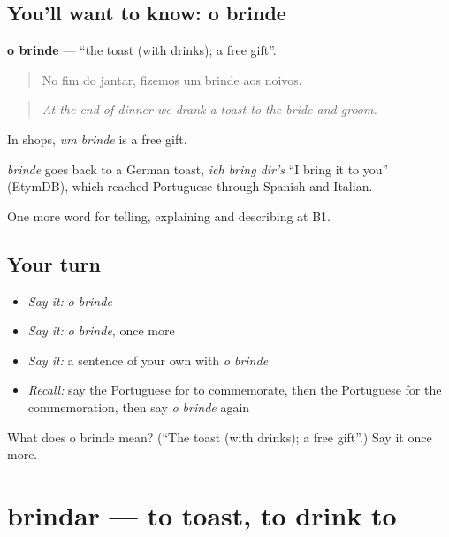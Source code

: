 \subsection*{You'll want to know: o brinde}
\textbf{o brinde} — \textquotedblleft{}the toast (with drinks); a free gift\textquotedblright{}.

\begin{quote}
No fim do jantar, fizemos um brinde aos noivos.
\end{quote}

\begin{quote}
\emph{At the end of dinner we drank a toast to the bride and groom.}
\end{quote}

In shops, \emph{um brinde} is a free gift.

\begin{cousinweb}
\emph{brinde} goes back to a German toast, \emph{ich bring dir’s} \textquotedblleft{}I bring it to you\textquotedblright{} (EtymDB), which reached Portuguese through Spanish and Italian.
\end{cousinweb}

\begin{grammarlens}[title={What you've built}]
One more word for telling, explaining and describing at B1.
\end{grammarlens}

\subsection*{Your turn}
\begin{itemize}
\raggedright
  \item \emph{Say it:} \emph{o brinde}
  \item \emph{Say it:} \emph{o brinde}, once more
  \item \emph{Say it:} a sentence of your own with \emph{o brinde}
  \item \emph{Recall:} say the Portuguese for to commemorate, then the Portuguese for the commemoration, then say \emph{o brinde} again
\end{itemize}

\begin{tcolorbox}[breakable,colback=teal!4,colframe=teal!35!black,title={Before you move on}]
What does o brinde mean? (\textquotedblleft{}The toast (with drinks); a free gift\textquotedblright{}.) Say it once more.
\end{tcolorbox}
\section[brindar]{brindar — to toast, to drink to}

